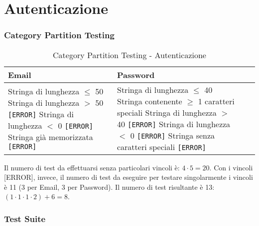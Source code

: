 \section{Autenticazione}
\subsubsection*{Category Partition Testing}
\begin{table}[H]
	\centering
	\footnotesize
	\renewcommand{\arraystretch}{1.3}
	\begin{tabular}{|p{3cm}|p{3cm}|p{4cm}|p{5cm}|}
		\hline
		\textbf{Email} & \textbf{Password} \\
		\hline
		Stringa di lunghezza $\leq$ 50 \newline
		Stringa di lunghezza $>$ 50 \texttt{[ERROR]} \newline
		Stringa di lunghezza $<$ 0 \texttt{[ERROR]} \newline
		Stringa già memorizzata \texttt{[ERROR]} &

		Stringa di lunghezza $\leq$ 40 \newline
		Stringa contenente $\geq$ 1 caratteri speciali \newline
		Stringa di lunghezza $>$ 40 \texttt{[ERROR]} \newline
		Stringa di lunghezza $<$ 0 \texttt{[ERROR]} \newline
		Stringa senza caratteri speciali \texttt{[ERROR]} \\
		\hline
	\end{tabular}
	\caption{Category Partition Testing - Autenticazione}
\end{table}
\noindent Il numero di test da effettuarsi senza particolari vincoli è: $4 \cdot 5 = 20$.
\noindent Con i vincoli [ERROR], invece, il numero di test da eseguire per testare singolarmente i vincoli è 11 (3 per Email, 3 per Password).
\noindent Il numero di test risultante è 13: $(1 \cdot 1 \cdot 1 \cdot 2) + 6 = 8$.

\subsubsection*{Test Suite}

